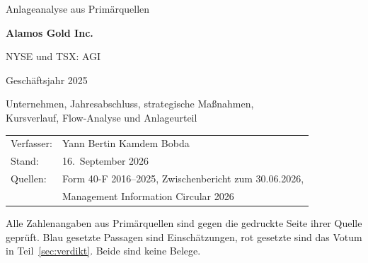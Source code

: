 \begin{titlepage}
\centering
{}
{\large Anlageanalyse aus Prim\"arquellen\par}
\vspace{1.2cm}
{\Huge\bfseries Alamos Gold Inc.\par}
\vspace{0.5cm}
{\LARGE NYSE und TSX: AGI\par}
\vspace{0.4cm}
{\Large Gesch\"aftsjahr 2025\par}
{\large Unternehmen, Jahresabschluss, strategische Ma{\ss}nahmen,\\
Kursverlauf, Flow-Analyse und Anlageurteil\par}
\begin{tabular}{ll}
Verfasser: & Yann Bertin Kamdem Bobda\\
Stand:     & 16.~September 2026\\
Quellen:   & Form 40-F 2016--2025, Zwischenbericht zum 30.06.2026,\\
           & Management Information Circular 2026\\
\end{tabular}
\par
\vspace{1.2cm}
\begin{minipage}{0.8\linewidth}
\centering\small
Alle Zahlenangaben aus Prim\"arquellen sind gegen die gedruckte Seite ihrer
Quelle gepr\"uft. Blau gesetzte Passagen sind Einsch\"atzungen, rot gesetzte
sind das Votum in Teil~\ref{sec:verdikt}. Beide sind keine Belege.
\end{minipage}
\end{titlepage}
